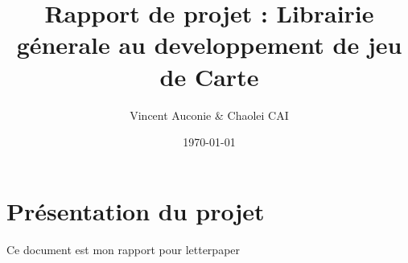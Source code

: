 \documentclass[12pt, letterpaper]{article}
\title{Rapport de projet : Librairie génerale au developpement de jeu de Carte}
\author{Vincent Auconie & Chaolei CAI
\\ 
  \multicolumn{1}{
      p{.7\textwidth}}{\centering\emph{Université de Paris \\
  UFR info blab labla\\}
  M1 Informatique}
}
\date{\today}
\begin{document}
\begin{titlepage}
    \maketitle
\end{titlepage}

\tableofcontents

\section{Présentation du projet}
Ce document est mon rapport pour letterpaper


\end{document}

